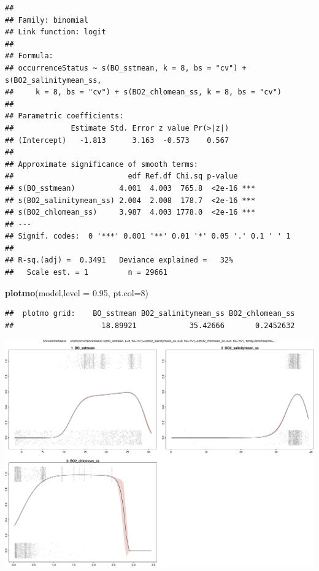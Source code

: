 \documentclass[
]{book}
\newenvironment{Shaded}{\begin{snugshade}}{\end{snugshade}}
\newcommand{\AttributeTok}[1]{\textcolor[rgb]{0.13,0.29,0.53}{#1}}
\newcommand{\DecValTok}[1]{\textcolor[rgb]{0.00,0.00,0.81}{#1}}
\newcommand{\FloatTok}[1]{\textcolor[rgb]{0.00,0.00,0.81}{#1}}
\newcommand{\FunctionTok}[1]{\textcolor[rgb]{0.13,0.29,0.53}{\textbf{#1}}}
\newcommand{\NormalTok}[1]{#1}
\begin{document}
\begin{verbatim}
## 
## Family: binomial 
## Link function: logit 
## 
## Formula:
## occurrenceStatus ~ s(BO_sstmean, k = 8, bs = "cv") + s(BO2_salinitymean_ss, 
##     k = 8, bs = "cv") + s(BO2_chlomean_ss, k = 8, bs = "cv")
## 
## Parametric coefficients:
##             Estimate Std. Error z value Pr(>|z|)
## (Intercept)   -1.813      3.163  -0.573    0.567
## 
## Approximate significance of smooth terms:
##                          edf Ref.df Chi.sq p-value    
## s(BO_sstmean)          4.001  4.003  765.8  <2e-16 ***
## s(BO2_salinitymean_ss) 2.004  2.008  178.7  <2e-16 ***
## s(BO2_chlomean_ss)     3.987  4.003 1778.0  <2e-16 ***
## ---
## Signif. codes:  0 '***' 0.001 '**' 0.01 '*' 0.05 '.' 0.1 ' ' 1
## 
## R-sq.(adj) =  0.3491   Deviance explained =   32%
##   Scale est. = 1         n = 29661
\end{verbatim}

\begin{Shaded}
\begin{Highlighting}[]
\FunctionTok{plotmo}\NormalTok{(model,}\AttributeTok{level =} \FloatTok{0.95}\NormalTok{, }\AttributeTok{pt.col=}\DecValTok{8}\NormalTok{)}
\end{Highlighting}
\end{Shaded}

\begin{verbatim}
##  plotmo grid:    BO_sstmean BO2_salinitymean_ss BO2_chlomean_ss
##                    18.89921            35.42666       0.2452632
\end{verbatim}

\includegraphics{_main_files/figure-latex/unnamed-chunk-63-1.pdf}
\end{document}
